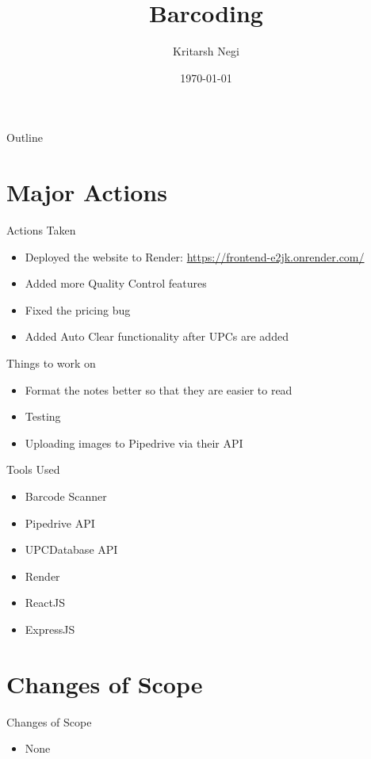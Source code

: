 \documentclass[aspectratio=1610]{beamer}
\title{Barcoding}
\author{Kritarsh Negi}
\institute{The CPAP Box}
\date{\today}
\begin{document}
\begin{frame}
    \titlepage
\end{frame}

\begin{frame}{Outline}
    \tableofcontents
\end{frame}

\section{Major Actions}
\begin{frame}{Actions Taken}
    \begin{itemize}
        \item Deployed the website to Render: \url{https://frontend-e2jk.onrender.com/}
        \item Added more Quality Control features
        \item Fixed the pricing bug
        \item Added Auto Clear functionality after UPCs are added
    \end{itemize}
\end{frame}
\begin{frame}{Things to work on }
    \begin{itemize}
        \item Format the notes better so that they are easier to read
        \item Testing
        \item Uploading images to Pipedrive via their API
    \end{itemize}
\end{frame}
\begin{frame}{Tools Used}
    \begin{itemize}
        \item Barcode Scanner
        \item Pipedrive API
        \item UPCDatabase API
        \item Render
        \item ReactJS
        \item ExpressJS
    \end{itemize}
\end{frame}
\section{Changes of Scope}
\begin{frame}{Changes of Scope}
    \begin{itemize}
        \item None 
    \end{itemize}
\end{frame}
\end{document}
